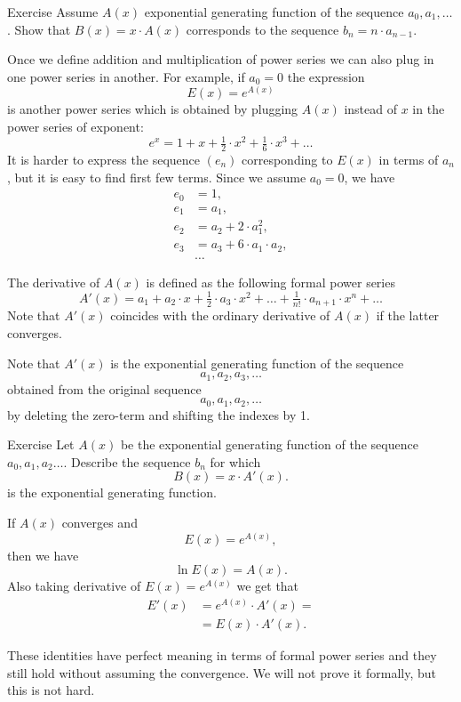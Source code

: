 \begin{thm}{Exercise}
Assume $A(x)$ exponential generating function of the sequence $a_0,a_1,\dots$.
Show that $B(x)=x\cdot A(x)$ corresponds to the sequence $b_n=n\cdot a_{n-1}$.
\end{thm}


Once we define addition and multiplication of power series we can also plug in one power series in another.
For example, if $a_0=0$ the expression 
\[E(x)=e^{A(x)}\] is another power series which is obtained by plugging $A(x)$ instead of $x$ in the power series of exponent:
\[e^x=1+x+\tfrac12\cdot x^2+\tfrac16\cdot x^3+\dots\]
It is harder to express the sequence $(e_n)$ corresponding to $E(x)$ in terms of $a_n$, but it is easy to find first few terms.
Since we assume $a_0=0$, we have
\begin{align*}
e_0&=1,
\\
e_1&=a_1,
\\
e_2&=a_2+2\cdot a_1^2,
\\
e_3&=a_3+6\cdot a_1\cdot a_2,
\\
&\dots
\end{align*}

The derivative of $A(x)$ is defined as the following formal power series 
\[A'(x)=a_1+a_2\cdot x+\tfrac12\cdot a_3\cdot x^2+\dots+\tfrac1{n!}\cdot a_{n+1}\cdot x^n+\dots\]
Note that $A'(x)$ coincides with the ordinary derivative of $A(x)$ if the latter converges.

Note that $A'(x)$ is the exponential generating function of the sequence 
\[a_1,a_2,a_3,\dots\]
obtained from the original sequence 
\[a_0,a_1,a_2,\dots\]
by deleting the zero-term and shifting the indexes by 1.


\begin{thm}{Exercise}
Let $A(x)$ be the exponential generating function of the sequence $a_0,a_1,a_2\dots$.
Describe the sequence $b_n$ for which 
\[B(x)=x\cdot A'(x).\]
is the exponential generating function.
\end{thm}

If $A(x)$ converges and
\[E(x)=e^{A(x)},\] 
then we have 
\[\ln E(x)=A(x).\]
Also taking derivative of $E(x)=e^{A(x)}$ we get that
\begin{align*}
E'(x)
&=e^{A(x)}\cdot A'(x)=
\\
&= E(x)\cdot A'(x).
\end{align*}


These identities have perfect meaning in terms of formal power series
and they still hold without assuming the convergence.
We will not prove it formally, but this is not hard.

